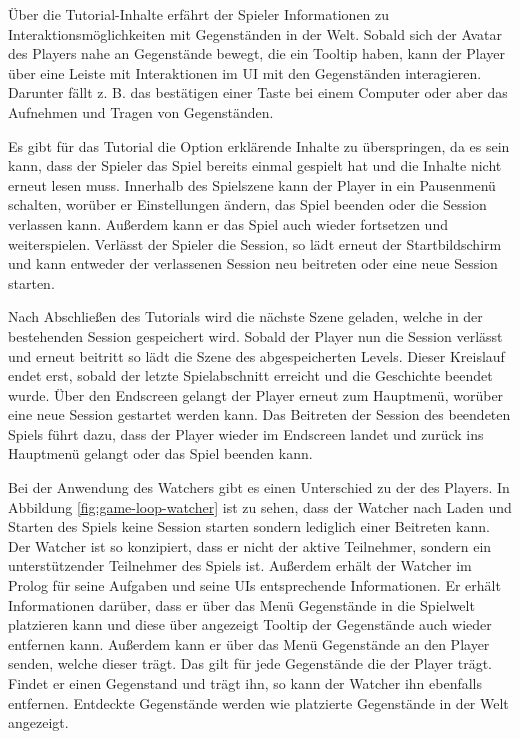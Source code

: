 Über die Tutorial-Inhalte erfährt der Spieler Informationen zu Interaktionsmöglichkeiten mit Gegenständen in der Welt. Sobald sich der Avatar des Players nahe an Gegenstände bewegt, die ein Tooltip haben, kann der Player über eine Leiste mit Interaktionen im UI mit den Gegenständen interagieren. Darunter fällt z. B. das bestätigen einer Taste bei einem Computer oder aber das Aufnehmen und Tragen von Gegenständen.

Es gibt für das Tutorial die Option erklärende Inhalte zu überspringen, da es sein kann, dass der Spieler das Spiel bereits einmal gespielt hat und die Inhalte nicht erneut lesen muss. Innerhalb des Spielszene kann der Player in ein Pausenmenü schalten, worüber er Einstellungen ändern, das Spiel beenden oder die Session verlassen kann. Außerdem kann er das Spiel auch wieder fortsetzen und weiterspielen. Verlässt der Spieler die Session, so lädt erneut der Startbildschirm und kann entweder der verlassenen Session neu beitreten oder eine neue Session starten.

Nach Abschließen des Tutorials wird die nächste Szene geladen, welche in der bestehenden Session gespeichert wird. Sobald der Player nun die Session verlässt und erneut beitritt so lädt die Szene des abgespeicherten Levels. Dieser Kreislauf endet erst, sobald der letzte Spielabschnitt erreicht und die Geschichte beendet wurde. Über den Endscreen gelangt der Player erneut zum Hauptmenü, worüber eine neue Session gestartet werden kann. Das Beitreten der Session des beendeten Spiels führt dazu, dass der Player wieder im Endscreen landet und zurück ins Hauptmenü gelangt oder das Spiel beenden kann.

Bei der Anwendung des Watchers gibt es einen Unterschied zu der des Players. In Abbildung \ref{fig:game-loop-watcher} ist zu sehen, dass der Watcher nach Laden und Starten des Spiels keine Session starten sondern lediglich einer Beitreten kann. Der Watcher ist so konzipiert, dass er nicht der aktive Teilnehmer, sondern ein unterstützender Teilnehmer des Spiels ist. Außerdem erhält der Watcher im Prolog für seine Aufgaben und seine \ac{UI}s entsprechende Informationen. Er erhält Informationen darüber, dass er über das Menü  Gegenstände in die Spielwelt platzieren kann und diese über angezeigt Tooltip der Gegenstände auch wieder entfernen kann. Außerdem kann er über das Menü  Gegenstände an den Player senden, welche dieser trägt. Das gilt für jede Gegenstände die der Player trägt. Findet er einen Gegenstand und trägt ihn, so kann der Watcher ihn ebenfalls entfernen. Entdeckte Gegenstände werden wie platzierte Gegenstände in der Welt angezeigt.

